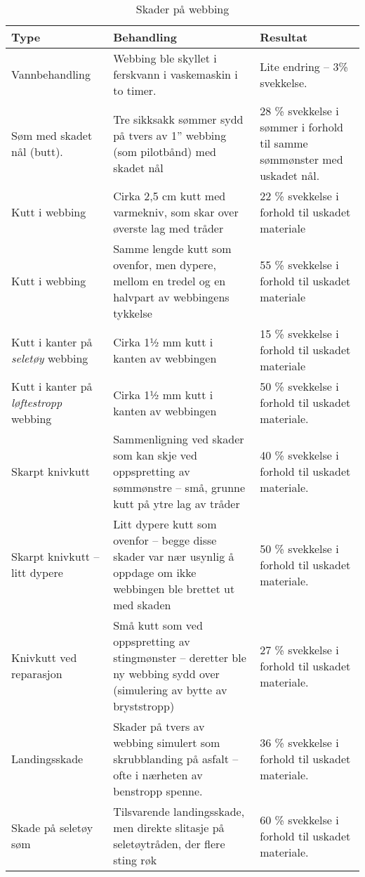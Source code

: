 \begin{table}
	\caption{Skader på webbing}
	\begin{tabular}{ | l | l | l | }
		\hline
		Type & Behandling & Resultat \\
		\hline
		Vannbehandling & Webbing ble skyllet i ferskvann i vaskemaskin i to timer. & Lite endring – 3\% svekkelse. \\
		\hline
		Søm med skadet nål (butt). & Tre sikksakk sømmer sydd på tvers av 1'' webbing (som pilotbånd) med skadet nål & 28 \% svekkelse i sømmer i forhold til samme sømmønster med uskadet nål. \\
		\hline
		Kutt i webbing & Cirka 2,5 cm kutt med varmekniv, som skar over øverste lag med tråder & 22 \% svekkelse i forhold til uskadet materiale \\
		\hline
		Kutt i webbing & Samme lengde kutt som ovenfor, men dypere, mellom en tredel og en halvpart av webbingens tykkelse & 55 \% svekkelse i forhold til uskadet materiale \\
		\hline
		Kutt i kanter på \emph{seletøy} webbing & Cirka 11⁄2 mm kutt i kanten av webbingen & 15 \% svekkelse i forhold til uskadet materiale \\
		\hline
		Kutt i kanter på \emph{løftestropp} webbing & Cirka 11⁄2 mm kutt i kanten av webbingen & 50 \% svekkelse i forhold til uskadet materiale. \\
		\hline
		Skarpt knivkutt & Sammenligning ved skader som kan skje ved oppspretting av sømmønstre – små, grunne kutt på ytre lag av tråder & 40 \% svekkelse i forhold til uskadet materiale. \\
		\hline
		Skarpt knivkutt -- litt dypere & Litt dypere kutt som ovenfor – begge disse skader var nær usynlig å oppdage om ikke webbingen ble brettet ut med skaden & 50 \% svekkelse i forhold til uskadet materiale. \\
		\hline
		Knivkutt ved reparasjon & Små kutt som ved oppspretting av stingmønster – deretter ble ny webbing sydd over (simulering av bytte av bryststropp) & 27 \% svekkelse i forhold til uskadet materiale. \\
		\hline
		Landingsskade & Skader på tvers av webbing simulert som skrubblanding på asfalt – ofte i nærheten av benstropp spenne. & 36 \% svekkelse i forhold til uskadet materiale. \\
		\hline
		Skade på seletøy søm & Tilsvarende landingsskade, men direkte slitasje på seletøytråden, der flere sting røk & 60 \% svekkelse i forhold til uskadet materiale. \\

\end{tabular}
\end{table}
